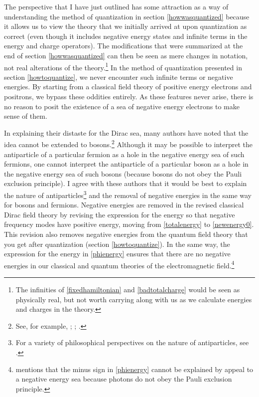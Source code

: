 \documentclass[onecolumn,secnumarabic,amsmath,amssymb,balancelastpage,nofootinbib]{article}
\begin{document}
The perspective that I have just outlined has some attraction as a way of understanding the method of quantization in section \ref{howwasquantized} because it allows us to view the theory that we initially arrived at upon quantization as correct (even though it includes negative energy states and infinite terms in the energy and charge operators).  The modifications that were summarized at the end of section \ref{howwasquantized} can then be seen as mere changes in notation, not real alterations of the theory.\footnote{The infinities of \eqref{fixedhamiltonian} and \eqref{badtotalcharge} would be seen as physically real, but not worth carrying along with us as we calculate energies and charges in the theory.}  In the method of quantization presented in section \ref{howtoquantize}, we never encounter such infinite terms or negative energies.  By starting from a classical field theory of positive energy electrons and positrons, we bypass these oddities entirely.  As these features never arise, there is no reason to posit the existence of a sea of negative energy electrons to make sense of them.

In explaining their distaste for the Dirac sea, many authors have noted that the idea cannot be extended to bosons.\footnote{See, for example, \citet[pg.\ 119--120]{weinberg1985}; \citet[sec.\ 5.3]{tong}; \citet[pg.\ 142]{schwartz}.}  Although it may be possible to interpret the antiparticle of a particular fermion as a hole in the negative energy sea of such fermions, one cannot interpret the antiparticle of a particular boson as a hole in the negative energy sea of such bosons (because bosons do not obey the Pauli exclusion principle).  I agree with these authors that it would be best to explain the nature of antiparticles\footnote{For a variety of philosophical perspectives on the nature of antiparticles, see \citet{saunders1991, saunders1992, wallace2009, arntzenius2009, baker2010, deckert}.} and the removal of negative energies in the same way for bosons and fermions.  Negative energies are removed in the revised classical Dirac field theory by revising the expression for the energy so that negative frequency modes have positive energy, moving from \eqref{totalenergy} to \eqref{newenergy0}.  This revision also removes negative energies from the quantum field theory that you get after quantization (section \ref{howtoquantize}).  In the same way, the expression for the energy in \eqref{phienergy} ensures that there are no negative energies in our classical and quantum theories of the electromagnetic field.\footnote{\citet[pg.\ 1918]{good1957} mentions that the minus sign in \eqref{phienergy} cannot be explained by appeal to a negative energy sea because photons do not obey the Pauli exclusion principle.}
\end{document}
